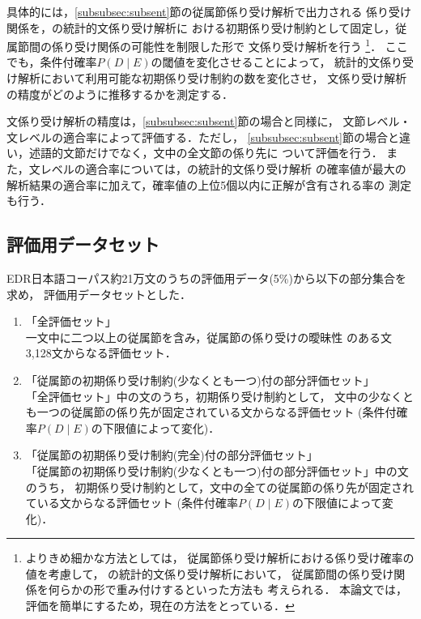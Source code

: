 具体的には，\ref{subsubsec:subsent}節の従属節係り受け解析で出力される
係り受け関係を，\cite{Fujio97aj,Fujio99aj}の統計的文係り受け解析に
おける初期係り受け制約として固定し，従属節間の係り受け関係の可能性を制限した形で
文係り受け解析を行う
\footnote{
  よりきめ細かな方法としては，
  従属節係り受け解析における係り受け確率の値を考慮して，
  \cite{Fujio97aj,Fujio99aj}の統計的文係り受け解析において，
  従属節間の係り受け関係を何らかの形で重み付けするといった方法も
  考えられる．
  本論文では，評価を簡単にするため，現在の方法をとっている．
}．
ここでも，条件付確率$P(D\mid E)$の閾値を変化させることによって，
統計的文係り受け解析において利用可能な初期係り受け制約の数を変化させ，
文係り受け解析の精度がどのように推移するかを測定する．

文係り受け解析の精度は，\ref{subsubsec:subsent}節の場合と同様に，
文節レベル・文レベルの適合率によって評価する．ただし，
\ref{subsubsec:subsent}節の場合と違い，述語的文節だけでなく，文中の全文節の係り先に
ついて評価を行う．
また，文レベルの適合率については，\cite{Fujio97aj,Fujio99aj}の統計的文係り受け解析
の確率値が最大の解析結果の適合率に加えて，確率値の上位5個以内に正解が含有される率の
測定も行う．

\subsection{評価用データセット}

EDR日本語コーパス約21万文のうちの評価用データ(5\%)から以下の部分集合を求め，
評価用データセットとした．
\begin{enumerate}
  \item 「全評価セット」\\
	一文中に二つ以上の従属節を含み，従属節の係り受けの曖昧性
	のある文3,128文からなる評価セット．

  \item 「従属節の初期係り受け制約(少なくとも一つ)付の部分評価セット」\\
	「全評価セット」中の文のうち，初期係り受け制約として，
	文中の少なくとも一つの従属節の係り先が固定されている文からなる評価セット
	(条件付確率$P(D\mid E)$の下限値によって変化)．	

  \item 「従属節の初期係り受け制約(完全)付の部分評価セット」\\
	「従属節の初期係り受け制約(少なくとも一つ)付の部分評価セット」中の文のうち，
	初期係り受け制約として，文中の全ての従属節の係り先が固定されている文からなる評価セット	
	(条件付確率$P(D\mid E)$の下限値によって変化)．	

\end{enumerate}


